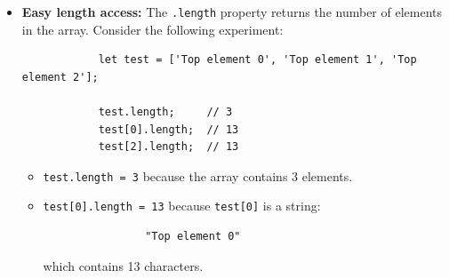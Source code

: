 \documentclass{scrbook}
\begin{document}
\begin{itemize}
        Consider the following experiment:
        \begin{lstlisting}
            let test = ['Top element 0', 'Top element 1', 'Top element 2'];
            
            test[0][0] = 'Nested element 0-0';
            test[0][1] = "Nested element 0-1";
            test[2][2] = "Nested element 2-2";
        \end{lstlisting}

        At first glance, it may seem that we are working with a two-dimensional array. However, this is not the case.

        \begin{itemize}
            \item Each element of \texttt{test} is a \textbf{string}, not an array.
            \item Expressions like \texttt{test[0][0]} are interpreted as:
            \begin{lstlisting}
                ("Top element 0")[0]
            \end{lstlisting}
            \item This means we are accessing a \textbf{character} of a string, not a second dimension.
        \end{itemize}

        \textbf{Important:} Strings in JavaScript are \textbf{immutable}. Therefore, assignments like:
        \begin{lstlisting}
            test[0][0] = 'Nested element 0-0';
        \end{lstlisting}
        do not actually modify the string. The operation is silently ignored, even though the console may display the assigned value.

    \item 
        \textbf{Easy length access:} The \texttt{.length} property returns the number of elements in the array. Consider the following experiment:
        \begin{lstlisting}
            let test = ['Top element 0', 'Top element 1', 'Top element 2'];
            
            test.length;     // 3
            test[0].length;  // 13
            test[2].length;  // 13
        \end{lstlisting}

        \begin{itemize}
            \item \texttt{test.length = 3} because the array contains 3 elements.
            \item \texttt{test[0].length = 13} because \texttt{test[0]} is a string:
            \begin{lstlisting}
                "Top element 0"
            \end{lstlisting}
            which contains 13 characters.
        \end{itemize}


\end{itemize}
\end{document}
